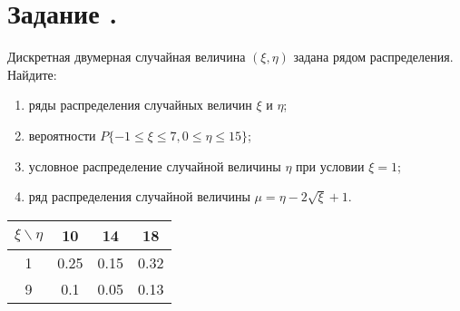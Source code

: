 \documentclass[12pt]{article}
\begin{document}
\section*{Задание .}

Дискретная двумерная случайная величина $(\xi, \eta)$ задана рядом распределения.
Найдите:

\begin{enumerate}
	\item ряды распределения случайных величин $\xi$ и $\eta$;
	\item вероятности $P\{-1 \leq \xi \leq 7, 0 \leq \eta \leq 15\}$;
	\item условное распределение случайной величины $\eta$ при условии $\xi = 1$;
	\item ряд распределения случайной величины $\mu = \eta - 2 \sqrt{\xi} + 1$.
\end{enumerate}

\begin{tabular}{|c|c|c|c|}
	\hline
	$\xi \backslash \eta$ & 10   & 14   & 18   \\
	\hline
	1                     & 0.25 & 0.15 & 0.32 \\
	\hline
	9                     & 0.1  & 0.05 & 0.13 \\
	\hline
\end{tabular}
\end{document}
